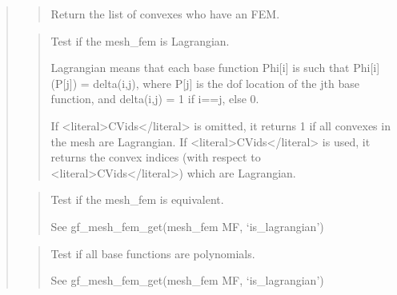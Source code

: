 \documentclass[a4paper,11pt,english]{sphinxmanual}
\begin{document}
\begin{quote}
\sphinxAtStartPar
{}
\begin{quote}

\sphinxAtStartPar
Return the list of convexes who have an FEM.
\end{quote}

\sphinxAtStartPar
{}
\begin{quote}

\sphinxAtStartPar
Test if the mesh\_fem is Lagrangian.

\sphinxAtStartPar
Lagrangian means that each base function Phi{[}i{]} is such that
Phi{[}i{]}(P{[}j{]}) = delta(i,j), where P{[}j{]} is the dof location of
the jth base function, and delta(i,j) = 1 if i==j, else 0.

\sphinxAtStartPar
If \textless{}literal\textgreater{}CVids\textless{}/literal\textgreater{} is omitted, it returns 1 if all convexes in the mesh
are Lagrangian. If \textless{}literal\textgreater{}CVids\textless{}/literal\textgreater{} is used, it returns the convex indices
(with respect to \textless{}literal\textgreater{}CVids\textless{}/literal\textgreater{}) which are Lagrangian.
\end{quote}

\sphinxAtStartPar
{}
\begin{quote}

\sphinxAtStartPar
Test if the mesh\_fem is equivalent.

\sphinxAtStartPar
See gf\_mesh\_fem\_get(mesh\_fem MF, ‘is\_lagrangian’)
\end{quote}

\sphinxAtStartPar
{}
\begin{quote}

\sphinxAtStartPar
Test if all base functions are polynomials.

\sphinxAtStartPar
See gf\_mesh\_fem\_get(mesh\_fem MF, ‘is\_lagrangian’)
\end{quote}

\sphinxAtStartPar
{}
\begin{quote}


\end{quote}
\end{quote}
\end{document}
